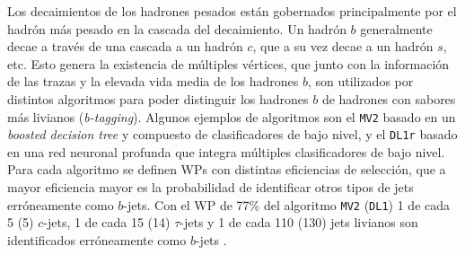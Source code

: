 Los decaimientos de los hadrones pesados están gobernados principalmente por el hadrón más pesado en la cascada del decaimiento. Un hadrón $b$ generalmente decae a través de una cascada a un hadrón $c$, que a su vez decae a un hadrón $s$, etc. Esto genera la existencia de múltiples 
vértices, que junto con la información de las trazas y la elevada vida media de los hadrones $b$, son utilizados por distintos algoritmos para poder distinguir los hadrones $b$ de hadrones con sabores más livianos (\textit{b-tagging}). Algunos ejemplos de algoritmos \cite{FTAG-2018-01} son el \texttt{MV2} basado en un \textit{boosted decision tree} y compuesto de clasificadores de bajo nivel, y el \texttt{DL1r} \cite{FTAG-2018-01, ATL-PHYS-PUB-2020-009} basado en una red neuronal profunda que integra múltiples clasificadores de bajo nivel. Para cada algoritmo se definen WPs con distintas eficiencias de selección, que a mayor eficiencia mayor es la probabilidad de identificar otros tipos de jets erróneamente como $b$-jets. Con el WP de 77\% del algoritmo \texttt{MV2} (\texttt{DL1}) 1 de cada 5 (5) $c$-jets, 1 de cada 15 (14) $\tau$-jets y 1 de cada 110 (130) jets livianos son identificados erróneamente como $b$-jets \cite{FTAG-2018-01}.



